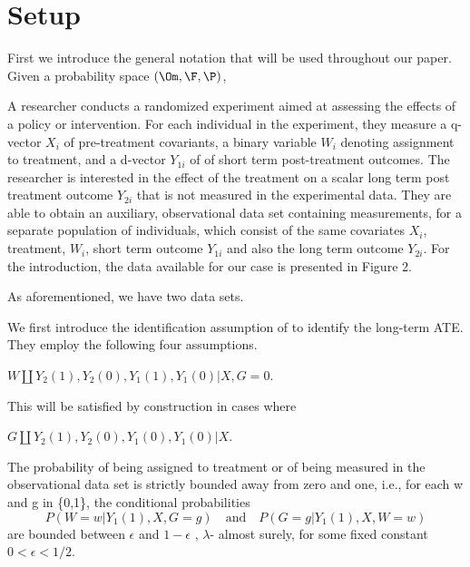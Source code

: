 \documentclass[uplatex,dvipdfmx]{jsarticle}
\begin{document}
\section{Setup}

First we introduce the general notation that will be used throughout our paper.
Given a probability space $(\Om,\F,\P)$, \todo

A researcher conducts a randomized experiment aimed at assessing the effects of a policy or intervention. For each individual in the experiment, they measure a q-vector $X_i$ of pre-treatment covariants, a binary variable $W_i$ denoting assignment to treatment, and a d-vector $Y_{1i}$ of of short term post-treatment outcomes. The researcher is interested in the effect of the treatment on a scalar long term post treatment outcome $Y_{2i} $ that is not measured in the experimental data. They are able to obtain an auxiliary, observational data set containing measurements, for a separate population of individuals, which consist of the same covariates $X_i $, treatment, $W_i$, short term outcome $Y_{1i} $ and also the long term outcome $Y_{2i}$. 
For the introduction, the data available for our case is presented in Figure 2. 


As aforementioned, we have two data sets. 

We first introduce the identification assumption of \cite{athey2020combining} to identify the long-term ATE. They employ the following four assumptions.
\cite{athey2020combining} 
\begin{assumption}\label{ass: exp1}
    $W \amalg Y_2(1), Y_2(0), Y_1(1), Y_1(0) | X, G=0$.
\end{assumption}

This will be satisfied by construction in cases where 

\begin{assumption}\label{ass: ex1}
    $G \amalg Y_2(1), Y_2(0), Y_1(0), Y_1(0) | X$.
\end{assumption}

\begin{assumption}
    The probability of being assigned to treatment or of being measured in the observational data set is strictly bounded away from zero and one, i.e., for each w and g in \{0,1\}, the conditional probabilities 
    \begin{equation}
        P(W = w | Y_1(1), X, G = g ) \quad\text{and}\quad P(G=g | Y_1(1), X, W = w) 
    \end{equation}
    are bounded between $\epsilon $ and $ 1 - \epsilon $ , $ \lambda$- almost surely, for some fixed constant $ 0 < \epsilon < 1/2 $.
\end{assumption}
\end{document}

